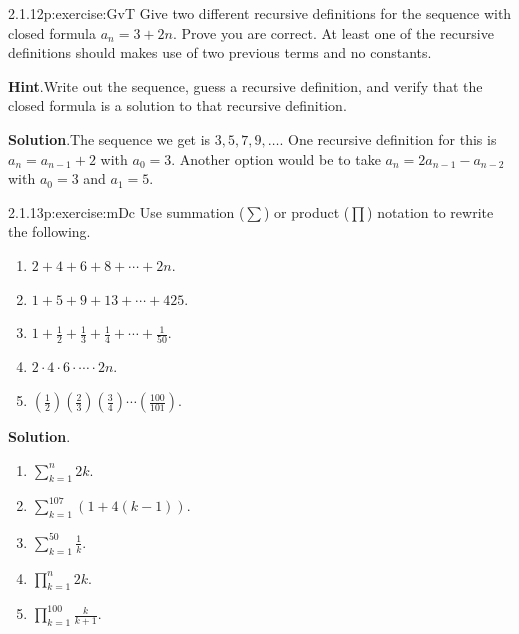 \documentclass[twoside,11pt,]{book}
\newcommand{\blocktitlefont}{\relax}
\numberwithin{equation}{chapter}
\renewcommand{\d}{\displaystyle}
\begin{document}
\begin{divisionsolution}{2.1.12}{}{p:exercise:GvT}%
Give two different recursive definitions for the sequence with closed formula \(a_n = 3 + 2n\).  Prove you are correct. At least one of the recursive definitions should makes use of two previous terms and no constants.%
\par\smallskip%
\noindent\textbf{\blocktitlefont Hint}.\quad{}Write out the sequence, guess a recursive definition, and verify that the closed formula is a solution to that recursive definition.%
\par\smallskip%
\noindent\textbf{\blocktitlefont Solution}.\quad{}The sequence we get is \(3, 5, 7, 9, \ldots\). One recursive definition for this is \(a_n = a_{n-1} + 2\) with \(a_0 = 3\). Another option would be to take \(a_n = 2a_{n-1} - a_{n-2}\) with \(a_0 = 3\) and \(a_1 = 5\).%
\end{divisionsolution}%
\begin{divisionsolution}{2.1.13}{}{p:exercise:mDc}%
Use summation (\(\sum\)) or product (\(\prod\)) notation to rewrite the following.%
\begin{multicols}{2}
\begin{enumerate}[label=(\alph*)]
\item{}\(2 + 4 + 6 + 8 + \cdots + 2n\).%
\item{}\(1 + 5 + 9 + 13 + \cdots + 425\).%
\item{}\(1 + \frac{1}{2} + \frac{1}{3} + \frac{1}{4} + \cdots + \frac{1}{50}\).%
\item{}\(2 \cdot 4 \cdot 6 \cdot \cdots \cdot 2n\).%
\item{}\((\frac{1}{2})(\frac{2}{3})(\frac{3}{4})\cdots(\frac{100}{101})\).%
\end{enumerate}
\end{multicols}
%
\par\smallskip%
\noindent\textbf{\blocktitlefont Solution}.\quad{}%
\begin{multicols}{2}
\begin{enumerate}[label=(\alph*)]
\item{}\(\d\sum_{k=1}^n 2k\).%
\item{}\(\d\sum_{k=1}^{107} (1 + 4(k-1))\).%
\item{}\(\d\sum_{k=1}^{50} \frac{1}{k}\).%
\item{}\(\d\prod_{k=1}^n 2k\).%
\item{}\(\d\prod_{k=1}^{100} \frac{k}{k+1}\).%
\end{enumerate}
\end{multicols}
%
\end{divisionsolution}%
\end{document}

